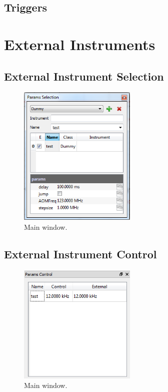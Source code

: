 \documentclass[11pt]{scrartcl}
\begin{document}
\subsection{Triggers}

\section{External Instruments}
\subsection{External Instrument Selection}
\begin{figure}[htbp]
\begin{center}
\includegraphics[width=0.5\textwidth]{ParamsSelection}
\end{center}
\caption{\label{ParamsSelection} Main window.}
\end{figure}

\subsection{External Instrument Control}
\begin{figure}[htbp]
\begin{center}
\includegraphics[width=0.5\textwidth]{ParamsControl}
\end{center}
\caption{\label{GlobalVariables} Main window.}
\end{figure}
\end{document}
